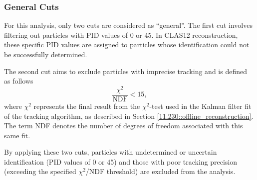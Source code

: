 \subsubsection{General Cuts}
\label{13.21::general_cuts}
    For this analysis, only two cuts are considered as ``general''.
    The first cut involves filtering out particles with PID values of 0 or 45.
    In CLAS12 reconstruction, these specific PID values are assigned to particles whose identification could not be successfully determined.

    The second cut aims to exclude particles with imprecise tracking and is defined as follows
    \begin{equation*}
        \frac{\chi^2}{\text{NDF}} < 15,
    \end{equation*}
    where $\chi^2$ represents the final result from the $\chi^2$-test used in the Kalman filter fit of the tracking algorithm, as described in Section \ref{11.230::offline_reconstruction}.
    The term NDF denotes the number of degrees of freedom associated with this same fit.

    By applying these two cuts, particles with undetermined or uncertain identification (PID values of 0 or 45) and those with poor tracking precision (exceeding the specified $\chi^2$/NDF threshold) are excluded from the analysis.
